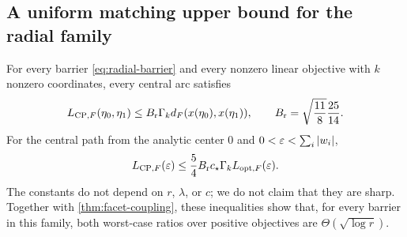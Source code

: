 \subsection{A uniform matching upper bound for the radial family}
\begin{theorem}
\label{thm:radial-upper}
For every barrier \eqref{eq:radial-barrier} and every nonzero linear
objective with $k$ nonzero coordinates, every central arc satisfies
\begin{equation}
 L_{\mathrm{CP},F}(\eta_0,\eta_1)\leq
 B_{\mathrm r}\Gamma_k d_F(x(\eta_0),x(\eta_1)),\qquad
 B_{\mathrm r}=\sqrt{\frac{11}{8}}\frac{25}{14}.
 \label{eq:radial-endpoint-upper}
\end{equation}
For the central path from the analytic center $0$ and
$0<\varepsilon<\sum_i|w_i|$,
\begin{equation}
 L_{\mathrm{CP},F}(\varepsilon)\leq
 \frac54 B_{\mathrm r}c_\star\Gamma_k L_{\mathrm{opt},F}(\varepsilon).
 \label{eq:radial-accuracy-upper}
\end{equation}
The constants do not depend on $r$, $\lambda$, or $c$; we do not
claim that they are sharp. Together with \cref{thm:facet-coupling},
these inequalities show that, for every barrier in this family, both
worst-case ratios over positive objectives are $\Theta(\sqrt{\log r})$.
\end{theorem}
